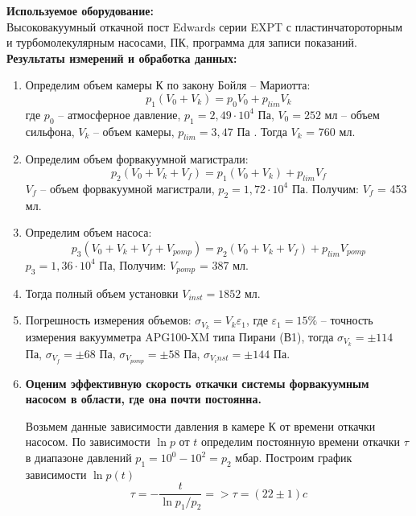 \documentclass[a4paper, 12pt]{article}%
\begin{document}
	
	\textbf{Используемое оборудование: }\\
	
	Высоковакуумный откачной пост Edwards серии EXPT с пластинчатороторным и турбомолекулярным насосами, ПК, программа для записи показаний.\\
	
	
	\textbf{Результаты измерений и обработка данных: }\\
	
	\begin{enumerate}
	\item Определим объем камеры К по закону Бойля -- Мариотта: 
	$$ p_1(V_0 + V_k) = p_0 V_0 + p_{lim} V_k$$ где $p_0$ -- атмосферное давление, $p_1 = 2,49 \cdot 10^4$ Па, $V_0 = 252$ мл -- объем сильфона, $V_k$ -- объем камеры, $p_{lim} = 3,47 $ Па . Тогда $V_k$ = 760 мл.
	
	\item Определим объем форвакуумной магистрали: $$ p_2(V_0 + V_k + V_f) = p_1 (V_0 + V_k) + p_{lim} V_f$$ $V_f$ -- объем форвакуумной магистрали, $p_2 = 1,72 \cdot 10^4$ Па. Получим: $V_f$ = 453 мл.
	
	\item  Определим объем насоса:  $$ p_3(V_0 + V_k + V_f + V_{pomp}) = p_2 (V_0 + V_k + V_f) + p_{lim} V_{pomp}$$ $p_3 = 1,36\cdot 10^4$ Па, Получим: $V_{pomp}$ = 387 мл. 
	
	\item Тогда полный объем установки $V_{inst} = 1852$ мл.
	\item Погрешность измерения объемов: $\sigma_{V_k} = V_k \varepsilon_1$, где $\varepsilon_1 = 15\% $ -- точность измерения вакуумметра APG100-XM типа Пирани (В1), тогда $\sigma_{V_k} = \pm 114 $ Па, $\sigma_{V_f} = \pm 68 $ Па, $\sigma_{V_{pomp}} = \pm 58 $ Па, $\sigma_{V_inst} = \pm 144 $ Па.
	
	\item\textbf{ Оценим эффективную скорость откачки системы форвакуумным насосом в области, где она почти постоянна.}
	
	
	 Возьмем данные зависимости давления в камере К от времени откачки насосом.
	 По зависимости $\ln p$ от $t$ определим постоянную времени откачки $\tau$ в диапазоне давлений $p_1 = 10^0 - 10^2 = p_2$ мбар. Построим график зависимости $\ln p(t)$
	 $$ \tau = - \frac{t}{\ln p_1/p_2} => \tau = (22 \pm 1) c$$
	 
	 \newpage
	

\end{enumerate}
\end{document}
